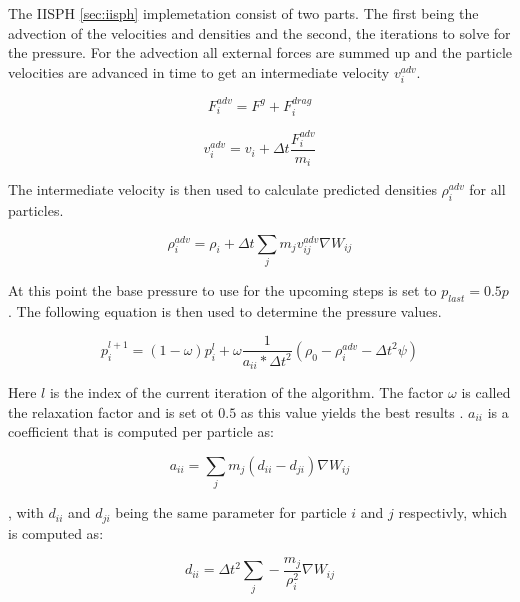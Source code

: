 \documentclass[intern]{cgMA}
\begin{document}
    The IISPH \ref{sec:iisph} implemetation consist of two parts. The first being the advection of the velocities and densities and the second, the iterations to solve for the pressure. For the advection all external forces are summed up and the particle velocities are advanced in time to get an intermediate velocity $v_i^{adv}$. \cite{6570475}

    \begin{equation}
        F_i^{adv} = F^g + F_i^{drag}
    \end{equation}

    \begin{equation}
        v_i^{adv} = v_i + \Delta t \frac{F_i^{adv}}{m_i}
    \end{equation}

    The intermediate velocity is then used to calculate predicted densities $\rho_i^{adv}$ for all particles. \cite{6570475}

    \begin{equation}
        \rho_i^{adv} = \rho_i + \Delta t \sum_j m_j v_{ij}^{adv} \nabla W_{ij}
    \end{equation}
    
    At this point the base pressure to use for the upcoming steps is set to $p_{last} = 0.5p$ \cite{6570475}. The following equation is then used to determine the pressure values.

    \begin{equation}
        p_i^{l+1} = (1 - \omega) p_i^l + \omega \frac{1}{a_{ii} * \Delta t^2} (\rho_0 - \rho_i^{adv} - \Delta t^2 \psi)
    \end{equation}

    Here $l$ is the index of the current iteration of the algorithm. The factor $\omega$ is called the relaxation factor and is set ot $0.5$ as this value yields the best results \cite{6570475}. $a_{ii}$ is a coefficient that is computed per particle as: 

    \begin{equation}
        a_{ii} = \sum_j m_j (d_{ii} - d_{ji}) \nabla W_{ij}
    \end{equation}

    , with $d_{ii}$ and $d_{ji}$ being the same parameter for particle $i$ and $j$ respectivly, which is computed as:

    \begin{equation}
        d_{ii} = \Delta t^2 \sum_j -\frac{m_j}{\rho_i^2} \nabla W_{ij}
    \end{equation}
\end{document}
